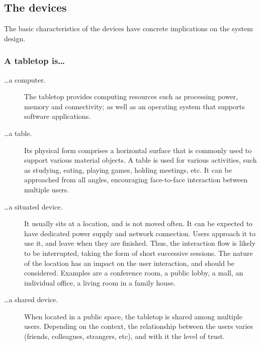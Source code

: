 \subsection{The devices}

The basic characteristics of the devices have concrete implications on the system design.

\subsubsection{A tabletop is\ldots}

\begin{description}

\item[\ldots a computer.]
The tabletop provides computing resources such as processing power, memory and connectivity; as well as an operating system that supports software applications.

\item[\ldots a table.] 
Its physical form comprises a horizontal surface that is commonly used to support various material objects.
A table is used for various activities, such as studying, eating, playing games, holding meetings, etc.
It can be approached from all angles, encouraging face-to-face interaction between multiple users.

\item[\ldots a situated device.] 
It usually sits at a location, and is not moved often.
It can be expected to have dedicated power supply and network connection.
Users approach it to use it, and leave when they are finished.
Thus, the interaction flow is likely to be interrupted, taking the form of short successive sessions.
The nature of the location has an impact on the user interaction, and should be considered.
Examples are a conference room, a public lobby, a mall, an individual office, a living room in a family house.

\item[\ldots a shared device.] 
When located in a public space, the tabletop is shared among multiple users.
Depending on the context, the relationship between the users varies (friends, colleagues, strangers, etc), and with it the level of trust.


\end{description}
